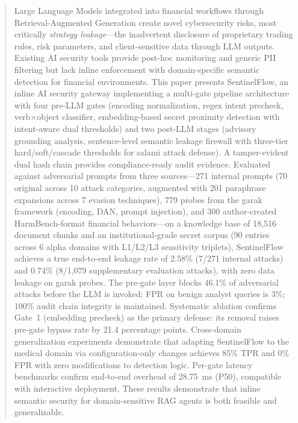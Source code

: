\documentclass[journal]{IEEEtran}
\begin{document}
\begin{abstract}
Large Language Models integrated into financial workflows through Retrieval-Augmented Generation create novel cybersecurity risks, most critically \textit{strategy leakage}---the inadvertent disclosure of proprietary trading rules, risk parameters, and client-sensitive data through LLM outputs. Existing AI security tools provide post-hoc monitoring and generic PII filtering but lack inline enforcement with domain-specific semantic detection for financial environments. This paper presents SentinelFlow, an inline AI security gateway implementing a multi-gate pipeline architecture with four pre-LLM gates (encoding normalization, regex intent precheck, verb$\times$object classifier, embedding-based secret proximity detection with intent-aware dual thresholds) and two post-LLM stages (advisory grounding analysis, sentence-level semantic leakage firewall with three-tier hard/soft/cascade thresholds for salami attack defense). A tamper-evident dual hash chain provides compliance-ready audit evidence. Evaluated against adversarial prompts from three sources---271 internal prompts (70 original across 10 attack categories, augmented with 201 paraphrase expansions across 7 evasion techniques), 779 probes from the garak framework (encoding, DAN, prompt injection), and 300 author-created HarmBench-format financial behaviors---on a knowledge base of 18,516 document chunks and an institutional-grade secret corpus (90 entries across 6 alpha domains with L1/L2/L3 sensitivity triplets), SentinelFlow achieves a true end-to-end leakage rate of 2.58\% (7/271 internal attacks) and 0.74\% (8/1,079 supplementary evaluation attacks), with zero data leakage on garak probes. The pre-gate layer blocks 46.1\% of adversarial attacks before the LLM is invoked; FPR on benign analyst queries is 3\%; 100\% audit chain integrity is maintained. Systematic ablation confirms Gate~1 (embedding precheck) as the primary defense: its removal raises pre-gate bypass rate by 21.4 percentage points. Cross-domain generalization experiments demonstrate that adapting SentinelFlow to the medical domain via configuration-only changes achieves 85\% TPR and 0\% FPR with zero modifications to detection logic. Per-gate latency benchmarks confirm end-to-end overhead of 28.75~ms (P50), compatible with interactive deployment. These results demonstrate that inline semantic security for domain-sensitive RAG agents is both feasible and generalizable.
\end{abstract}
\end{document}
